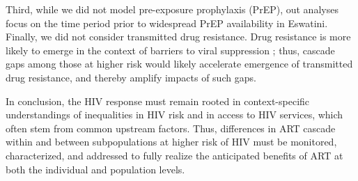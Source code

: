Third, while we did not model pre-exposure prophylaxis (PrEP),
out analyses focus on the time period
prior to widespread PrEP availability in Eswatini.
Finally, we did not consider transmitted drug resistance.
Drug resistance is more likely to emerge
in the context of barriers to viral suppression \cite{Pham2014};
thus, cascade gaps among those at higher risk
would likely accelerate emergence of transmitted drug resistance,
and thereby amplify impacts of such gaps.
\par
In conclusion, the HIV response must remain rooted in
context-specific understandings of inequalities in HIV risk and in access to HIV services,
which often stem from common upstream factors.
Thus, differences in ART cascade within and between subpopulations at higher risk of HIV
must be monitored, characterized, and addressed
to fully realize the anticipated benefits of ART
at both the individual and population levels.
\enlargethispage{2ex} %
